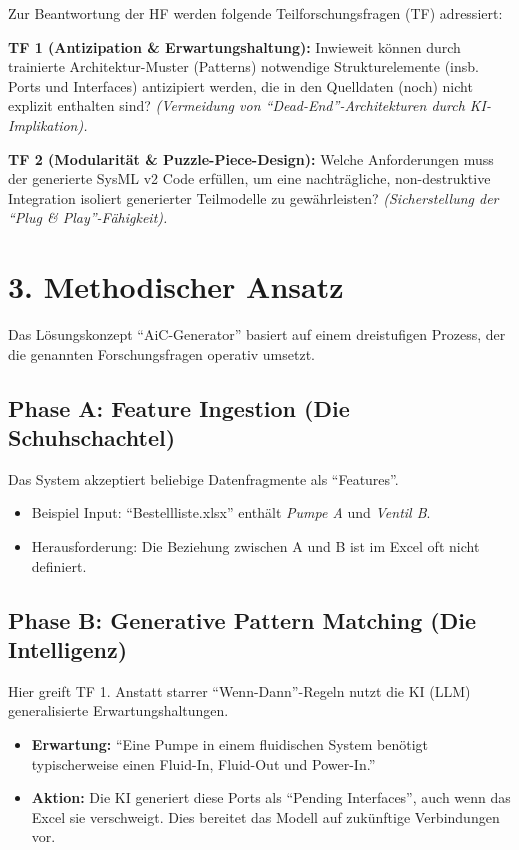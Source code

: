 \documentclass[a4paper,11pt]{article}
\begin{document}
Zur Beantwortung der HF werden folgende Teilforschungsfragen (TF) adressiert:

\textbf{TF 1 (Antizipation \& Erwartungshaltung):}
Inwieweit können durch trainierte Architektur-Muster (Patterns) notwendige Strukturelemente (insb. Ports und Interfaces) antizipiert werden, die in den Quelldaten (noch) nicht explizit enthalten sind? 
\textit{(Vermeidung von \enquote{Dead-End}-Architekturen durch KI-Implikation).}

\textbf{TF 2 (Modularität \& Puzzle-Piece-Design):}
Welche Anforderungen muss der generierte SysML v2 Code erfüllen, um eine nachträgliche, non-destruktive Integration isoliert generierter Teilmodelle zu gewährleisten?
\textit{(Sicherstellung der \enquote{Plug \& Play}-Fähigkeit).}

\section{3. Methodischer Ansatz}

Das Lösungskonzept \enquote{AiC-Generator} basiert auf einem dreistufigen Prozess, der die genannten Forschungsfragen operativ umsetzt.

\subsection*{Phase A: Feature Ingestion (Die Schuhschachtel)}
Das System akzeptiert beliebige Datenfragmente als \enquote{Features}. 
\begin{itemize}
    \item Beispiel Input: \enquote{Bestellliste.xlsx} enthält \textit{Pumpe A} und \textit{Ventil B}.
    \item Herausforderung: Die Beziehung zwischen A und B ist im Excel oft nicht definiert.
\end{itemize}

\subsection*{Phase B: Generative Pattern Matching (Die Intelligenz)}
Hier greift TF 1. Anstatt starrer \enquote{Wenn-Dann}-Regeln nutzt die KI (LLM) generalisierte Erwartungshaltungen.
\begin{itemize}
    \item \textbf{Erwartung:} \enquote{Eine Pumpe in einem fluidischen System benötigt typischerweise einen Fluid-In, Fluid-Out und Power-In.}
    \item \textbf{Aktion:} Die KI generiert diese Ports als \enquote{Pending Interfaces}, auch wenn das Excel sie verschweigt. Dies bereitet das Modell auf zukünftige Verbindungen vor.
\end{itemize}
\end{document}
